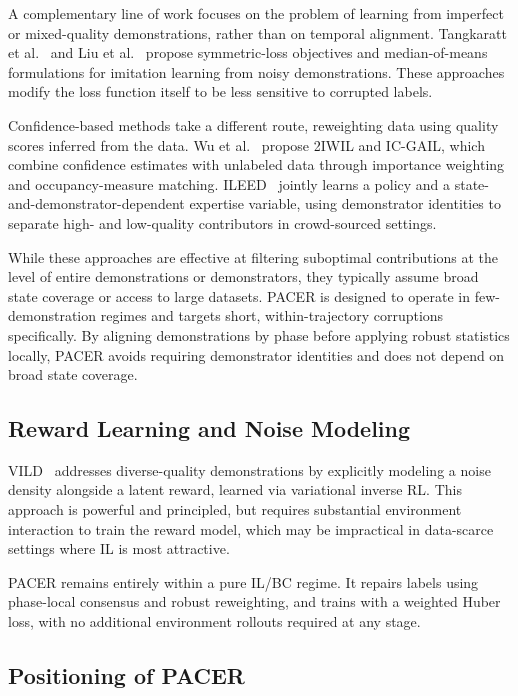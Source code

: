 \documentclass[a4paper, 10pt, conference]{ieeeconf}
\begin{document}
A complementary line of work focuses on the problem of learning from imperfect or mixed-quality demonstrations, rather than on temporal alignment.
Tangkaratt et al.~\cite{tangkaratt2020robust} and Liu et al.~\cite{liu2022robust} propose symmetric-loss objectives and median-of-means formulations for imitation learning from noisy demonstrations.
These approaches modify the loss function itself to be less sensitive to corrupted labels.

Confidence-based methods take a different route, reweighting data using quality scores inferred from the data.
Wu et al.~\cite{wu2019imperfect} propose 2IWIL and IC-GAIL, which combine confidence estimates with unlabeled data through importance weighting and occupancy-measure matching.
ILEED~\cite{beliaev2022ileed} jointly learns a policy and a state-and-demonstrator-dependent expertise variable, using demonstrator identities to separate high- and low-quality contributors in crowd-sourced settings.

While these approaches are effective at filtering suboptimal contributions at the level of entire demonstrations or demonstrators, they typically assume broad state coverage or access to large datasets.
PACER is designed to operate in few-demonstration regimes and targets short, within-trajectory corruptions specifically.
By aligning demonstrations by phase before applying robust statistics locally, PACER avoids requiring demonstrator identities and does not depend on broad state coverage.

\subsection{Reward Learning and Noise Modeling}

VILD~\cite{tangkaratt2019vild} addresses diverse-quality demonstrations by explicitly modeling a noise density alongside a latent reward, learned via variational inverse RL.\@
This approach is powerful and principled, but requires substantial environment interaction to train the reward model, which may be impractical in data-scarce settings where IL is most attractive.

PACER remains entirely within a pure IL/BC regime.
It repairs labels using phase-local consensus and robust reweighting, and trains with a weighted Huber loss, with no additional environment rollouts required at any stage.

\subsection{Positioning of PACER}
\end{document}
